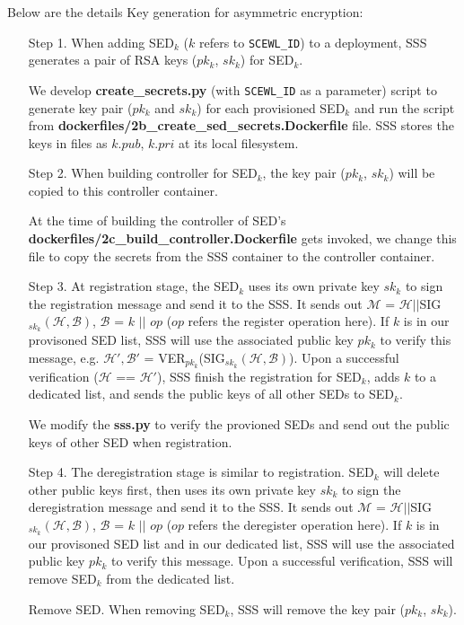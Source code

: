 \documentclass[11pt,oneside,onecolumn,letterpaper]{article}
\begin{document}
Below are the details Key generation for asymmetric encryption:
\begin{itemize}
  \item[Step 1.] When adding SED$_k$ ($k$ refers to \verb|SCEWL_ID|) to a deployment, SSS generates a pair of RSA keys ($pk_k$, $sk_k$) for SED$_k$.
  
  We develop \textbf{create\_secrets.py} (with \verb|SCEWL_ID| as a parameter) script to generate key pair ($pk_k$ and $sk_k$) for each provisioned SED$_k$ and run the script from  \textbf{dockerfiles/2b\_create\_sed\_secrets.Dockerfile} file.
  SSS stores the keys in files as $k.pub$, $k.pri$ at its local filesystem.

  \item[Step 2.] When building controller for SED$_k$, the key pair ($pk_k$, $sk_k$) will be copied to this controller container.
  
  At the time of building the controller of SED's \textbf{dockerfiles/2c\_build\_controller.Dockerfile}  gets invoked, we change this file to copy the secrets from the SSS container to the controller container.

  \item[Step 3.] At registration stage, the SED$_k$ uses its own private key $sk_k$ to sign the registration message and send it to the SSS.
  It sends out $\mathcal{M}$ = $\mathcal{H} || $SIG$_{sk_k}(\mathcal{H}, \mathcal{B})$, $\mathcal{B}$ = $k$ $||$ $op$ ($op$ refers the register operation here).
  If $k$ is in our provisoned SED list, SSS will use the associated public key $pk_k$ to verify this message, e.g. $\mathcal{H'}, \mathcal{B'}$ = VER$_{pk_k}$(SIG$_{sk_k}(\mathcal{H}, \mathcal{B})$).
  Upon a successful verification ($\mathcal{H}$ == $\mathcal{H'}$), SSS finish the registration for SED$_k$, adds $k$ to a dedicated list, and sends the public keys of all other SEDs to SED$_k$.
  
  We modify the \textbf{sss.py} to verify the provioned SEDs and send out the public keys of other SED when registration.

  \item[Step 4.] The deregistration stage is similar to registration.
  SED$_k$ will delete other public keys first, then uses its own private key $sk_k$ to sign the deregistration message and send it to the SSS.
  It sends out $\mathcal{M}$ = $\mathcal{H} || $SIG$_{sk_k}(\mathcal{H}, \mathcal{B})$, $\mathcal{B}$ = $k$ $||$ $op$ ($op$ refers the deregister operation here).
  If $k$ is in our provisoned SED list and in our dedicated list, SSS will use the associated public key $pk_k$ to verify this message.
  Upon a successful verification, SSS will remove SED$_k$ from the dedicated list.

  \item[Remove SED.] When removing SED$_k$, SSS will remove the key pair ($pk_k$, $sk_k$).
\end{itemize}
\end{document}
